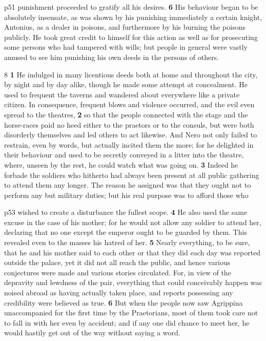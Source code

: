 p51 punishment proceeded to gratify all his desires. \textbf{6} His behaviour began to be absolutely insensate, as was shown by his punishing immediately a certain knight, Antonius, as a dealer in poisons, and furthermore by his burning the poisons publicly. He took great credit to himself for this action as well as for prosecuting some persons who had tampered with wills; but people in general were vastly amused to see him punishing his own deeds in the persons of others.

8 \textbf{1} He indulged in many licentious deeds both at home and throughout the city, by night and by day alike, though he made some attempt at concealment. He used to frequent the taverns and wandered about everywhere like a private citizen. In consequence, frequent blows and violence occurred, and the evil even spread to the theatres, \textbf{2} so that the people connected with the stage and the horse-races paid no heed either to the praetors or to the consuls, but were both disorderly themselves and led others to act likewise. And Nero not only failed to restrain, even by words, but actually incited them the more; for he delighted in their behaviour and used to be secretly conveyed in a litter into the theatre, where, unseen by the rest, he could watch what was going on. \textbf{3} Indeed he forbade the soldiers who hitherto had always been present at all public gathering to attend them any longer. The reason he assigned was that they ought not to perform any but military duties; but his real purpose was to afford those who

p53 wished to create a disturbance the fullest scope. \textbf{4} He also used the same excuse in the case of his mother; for he would not allow any soldier to attend her, declaring that no one except the emperor ought to be guarded by them. This revealed even to the masses his hatred of her. \textbf{5} Nearly everything, to be sure, that he and his mother said to each other or that they did each day was reported outside the palace, yet it did not all reach the public, and hence various conjectures were made and various stories circulated. For, in view of the depravity and lewdness of the pair, everything that could conceivably happen was noised abroad as having actually taken place, and reports possessing any credibility were believed as true. \textbf{6} But when the people now saw Agrippina unaccompanied for the first time by the Praetorians, most of them took care not to fall in with her even by accident; and if any one did chance to meet her, he would hastily get out of the way without saying a word.

